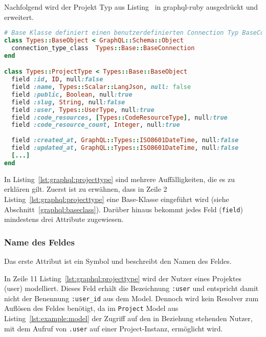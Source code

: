 Nachfolgend wird der Projekt Typ aus Listing~ in graphql-ruby ausgedrückt und erweitert.

\begin{lstlisting}[language=Ruby,float=h!,caption={Definition des ProjectTypes zum Abbilden von Project Model Instanzen}, label={lst:graphql:projecttype}]
# Base Klasse definiert einen benutzerdefinierten Connection Typ BaseConnection 
class Types::BaseObject < GraphQL::Schema::Object
  connection_type_class  Types::Base::BaseConnection
end

class Types::ProjectType < Types::Base::BaseObject
  field :id, ID, null:false
  field :name, Types::Scalar::LangJson, null: false
  field :public, Boolean, null:true
  field :slug, String, null:false
  field :user, Types::UserType, null:true
  field :code_resources, [Types::CodeResourceType], null:true
  field :code_resource_count, Integer, null:true
  
  field :created_at, GraphQL::Types::ISO8601DateTime, null:false
  field :updated_at, GraphQL::Types::ISO8601DateTime, null:false
  [...]
end
\end{lstlisting}

In Listing~\ref{lst:graphql:projecttype} sind mehrere Auffälligkeiten, die es zu erklären gilt.
Zuerst ist zu erwähnen, dass in Zeile 2 Listing~\ref{lst:graphql:projecttype} eine Base-Klasse eingeführt wird (siehe Abschnitt~\ref{graphql:baseclass}).
Darüber hinaus bekommt jedes Feld (\texttt{field}) mindestens drei Attribute zugewiesen. 

\subsubsection{Name des Feldes}
Das erste Attribut ist ein Symbol und beschreibt den Namen des Feldes. 

In Zeile 11 Listing~\ref{lst:graphql:projecttype} wird der Nutzer eines Projektes (user) modelliert. Dieses Feld erhält die Bezeichnung \texttt{:user} und entspricht damit nicht der Benennung \texttt{:user\_id} aus dem Model. Dennoch wird kein Resolver zum Auflösen des Feldes benötigt, da im \texttt{Project} Model aus Listing~\ref{lst:example:model} der Zugriff auf den in Beziehung stehenden Nutzer, mit dem Aufruf von \texttt{.user} auf einer Project-Instanz, ermöglicht wird. 

